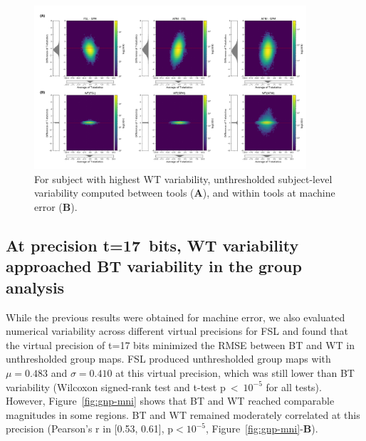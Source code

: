 \documentclass[11pt,onecolumn]{article}
\begin{document}
\begin{figure}[ht]
  \centering
  \includegraphics[width=0.9\textwidth]{figures/plots/Bland-Altman/unthresh-sbj05.png}
  \caption{For subject with highest WT variability,
    unthresholded subject-level variability computed between tools (\textbf{A}), and within tools at machine error (\textbf{B}).}
  \label{fig:unthresh-maps-sbj}
\end{figure}

\subsection{At precision t=17~bits, WT variability approached BT variability in the group analysis}

While the previous results were obtained for machine error, we also
evaluated numerical variability across different virtual precisions for FSL
and found that the virtual precision of t=17 bits minimized the RMSE
between BT and WT in unthresholded group maps.
FSL produced unthresholded group maps with $\mu=0.483$ and $\sigma=0.410$ at this virtual precision,
which was still lower than BT variability
(Wilcoxon signed-rank test and t-test p~\textless~$10^{-5}$ for all tests).
However, Figure~\ref{fig:gnp-mni} shows that
BT and WT reached comparable magnitudes in some regions. BT and WT remained
moderately correlated at this precision (Pearson's r
in [0.53, 0.61], p$< 10^{-5}$, Figure~\ref{fig:gnp-mni}-\textbf{B}).
\end{document}
